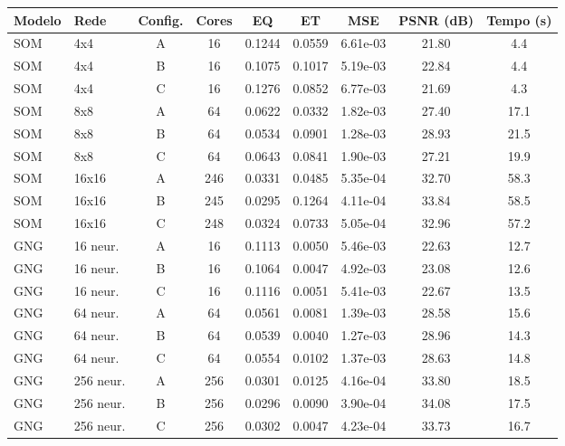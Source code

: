 \begin{tabular}{llccccccc}
\toprule
Modelo & Rede & Config. & Cores & EQ & ET & MSE & PSNR (dB) & Tempo (s)\\
\midrule
SOM & 4x4 & A & 16 & 0.1244 & 0.0559 & 6.61e-03 & 21.80 & 4.4\\
SOM & 4x4 & B & 16 & 0.1075 & 0.1017 & 5.19e-03 & 22.84 & 4.4\\
SOM & 4x4 & C & 16 & 0.1276 & 0.0852 & 6.77e-03 & 21.69 & 4.3\\
\midrule
SOM & 8x8 & A & 64 & 0.0622 & 0.0332 & 1.82e-03 & 27.40 & 17.1\\
SOM & 8x8 & B & 64 & 0.0534 & 0.0901 & 1.28e-03 & 28.93 & 21.5\\
SOM & 8x8 & C & 64 & 0.0643 & 0.0841 & 1.90e-03 & 27.21 & 19.9\\
\midrule
SOM & 16x16 & A & 246 & 0.0331 & 0.0485 & 5.35e-04 & 32.70 & 58.3\\
SOM & 16x16 & B & 245 & 0.0295 & 0.1264 & 4.11e-04 & 33.84 & 58.5\\
SOM & 16x16 & C & 248 & 0.0324 & 0.0733 & 5.05e-04 & 32.96 & 57.2\\
\midrule
GNG & 16 neur. & A & 16 & 0.1113 & 0.0050 & 5.46e-03 & 22.63 & 12.7\\
GNG & 16 neur. & B & 16 & 0.1064 & 0.0047 & 4.92e-03 & 23.08 & 12.6\\
GNG & 16 neur. & C & 16 & 0.1116 & 0.0051 & 5.41e-03 & 22.67 & 13.5\\
\midrule
GNG & 64 neur. & A & 64 & 0.0561 & 0.0081 & 1.39e-03 & 28.58 & 15.6\\
GNG & 64 neur. & B & 64 & 0.0539 & 0.0040 & 1.27e-03 & 28.96 & 14.3\\
GNG & 64 neur. & C & 64 & 0.0554 & 0.0102 & 1.37e-03 & 28.63 & 14.8\\
\midrule
GNG & 256 neur. & A & 256 & 0.0301 & 0.0125 & 4.16e-04 & 33.80 & 18.5\\
GNG & 256 neur. & B & 256 & 0.0296 & 0.0090 & 3.90e-04 & 34.08 & 17.5\\
GNG & 256 neur. & C & 256 & 0.0302 & 0.0047 & 4.23e-04 & 33.73 & 16.7\\
\bottomrule
\end{tabular}
